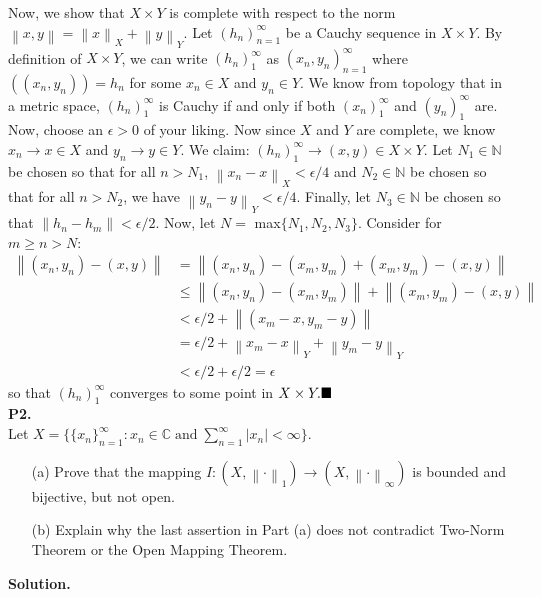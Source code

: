\documentclass{article}
\newcommand{\norm}[1]{\left\lVert#1\right\rVert}
\begin{document}
    Now, we show that $X\times Y$ is complete with respect to the norm $\norm{x,y} = \norm{x}_X + \norm{y}_Y$. Let $(h_n)_{n=1}^{\infty}$ be a Cauchy sequence
    in $X\times Y$. By definition of $X\times Y$, we can write $(h_n)_1^{\infty}$ as $(x_n,y_n)_{n=1}^{\infty}$ where $((x_n,y_n))=h_n$ for some $x_n\in X$ and $y_n\in Y$.
    We know from topology that in a metric space, $(h_n)_1^{\infty}$ is Cauchy if and only if both $(x_n)_1^{\infty}$ and $(y_n)_1^{\infty}$ are.
    Now, choose an $\epsilon>0$ of your liking.
    Now since $X$ and $Y$ are complete, we know $x_n\to x\in X$ and $y_n\to y\in Y$. We claim: $(h_n)_1^{\infty} \to (x,y)\in X\times Y$.
    Let $N_1\in\mathbb{N}$ be chosen so that for all $n>N_1$, $\norm{x_n-x}_X<\epsilon/4$ and $N_2\in\mathbb{N}$ be chosen so that for all $n>N_2$, we have
    $\norm{y_n-y}_Y < \epsilon/4$. Finally, let $N_3\in\mathbb{N}$ be chosen so that $\norm{h_n-h_m}<\epsilon/2$. Now, 
    let $N =$ max$\{N_1,N_2,N_3\}$. Consider for $m\geq n>N$:
    \begin{align*}
        \norm{(x_n,y_n)-(x,y)} &= \norm{(x_n,y_n)-(x_m,y_m)+(x_m,y_m)-(x,y)} \\
            &\leq \norm{(x_n,y_n)-(x_m,y_m)} + \norm{(x_m,y_m)-(x,y)} \\
            &< \epsilon/2 + \norm{(x_m-x,y_m-y)} \\
            &= \epsilon/2 + \norm{x_m-x}_Y + \norm{y_m-y}_Y \\
            &< \epsilon/2 + \epsilon/2 = \epsilon
    \end{align*}
    so that $(h_n)_1^{\infty}$ converges to some point in $X\times Y.\hfill\blacksquare$\\

    \textbf{P2.}\\

    Let $X = \{\{x_n\}_{n=1}^{\infty}: x_n\in\mathbb{C}\;\text{and}\; \sum_{n=1}^{\infty} |x_n|<\infty\}$.
    \begin{enumerate}
        \item[(a)] Prove that the mapping $I: (X,\norm{\cdot}_1)\to(X,\norm{\cdot}_{\infty})$ is bounded and bijective, but not open.
        \item[(b)] Explain why the last assertion in Part (a) does not contradict Two-Norm Theorem or the Open Mapping Theorem.
    \end{enumerate}

    \textbf{Solution.}\\
\end{document}
